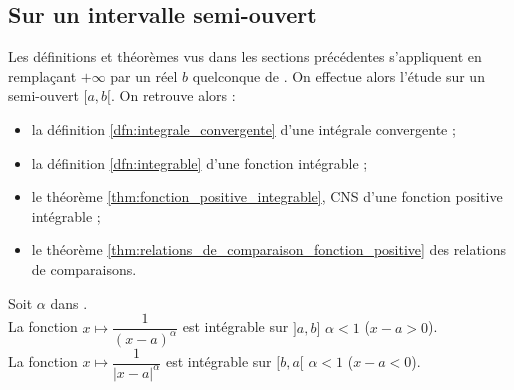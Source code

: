 \documentclass[11pt,a4paper,fleqn,pdftex]{report}
\begin{document}
\subsection{Sur un intervalle semi-ouvert} %
\label{sub:sur_un_intervalle_semi_ouvert}
Les définitions et théorèmes vus dans les sections précédentes s'appliquent en remplaçant $+\infty$ par un réel $b$ quelconque de \Reel{}. On effectue alors l'étude sur un semi-ouvert $[a,b[$. On retrouve alors : 
\begin{itemize}[label=$-$]
    \item la définition \ref{dfn:integrale_convergente} d'une intégrale convergente ;
    \item la définition \ref{dfn:integrable} d'une fonction intégrable ;
    \item le théorème \ref{thm:fonction_positive_integrable}, \gls{CNS} d'une fonction positive intégrable ;
    \item le théorème \ref{thm:relations_de_comparaison_fonction_positive} des relations de comparaisons.
\end{itemize}
\begin{itheorem}
     Soit $\alpha$ dans \Reel{}.\\
     La fonction $x \longmapsto \dfrac{1}{(x-a)^\alpha}$ est intégrable sur $]a,b]$ \ssi{} $\alpha < 1$ ($x-a > 0$). \\
     La fonction $x \mapsto \dfrac{1}{|x-a|^\alpha}$ est intégrable sur $[b,a[$ \ssi{} $\alpha < 1$ \newline ($x-a < 0$).
\end{itheorem}
\end{document}
